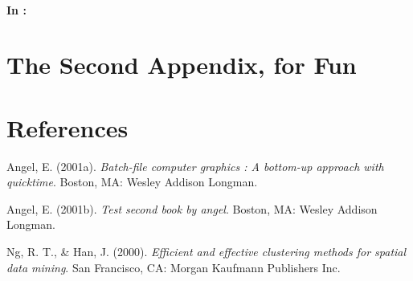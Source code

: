 \documentclass[12pt,twoside]{amherstthesis}
\begin{document}
  \subsubsection{\texorpdfstring{In
  \protect\hyperlink{ref_labels}{}:}{In :}}\label{in}
  
  \begin{Shaded}
  \begin{Highlighting}[]
  \NormalTok{(}\OperatorTok{!}
    \NormalTok{(}\NormalTok{, } \NormalTok{)}
  \NormalTok{(}\OperatorTok{!}
      \NormalTok{(}\NormalTok{, } \NormalTok{)}
  \NormalTok{(}\OperatorTok{!}
      \NormalTok{(}\NormalTok{, } \NormalTok{)}
  \NormalTok{(}\OperatorTok{!}
  \OperatorTok{::}\NormalTok{(}\NormalTok{)}
  \NormalTok{\}}
  \end{Highlighting}
  \end{Shaded}
  
  \chapter{The Second Appendix, for
  Fun}\label{the-second-appendix-for-fun}
  
  \backmatter
  
  \chapter{References}\label{references}
  
  \noindent
  
  \setlength{\parindent}{-0.20in} \setlength{\leftskip}{0.20in}
  \setlength{\parskip}{8pt}
  
  \hypertarget{refs}{}
  \hypertarget{ref-angel2001}{}
  Angel, E. (2001a). \emph{Batch-file computer graphics : A bottom-up
  approach with quicktime}. Boston, MA: Wesley Addison Longman.
  
  \hypertarget{ref-angel2002a}{}
  Angel, E. (2001b). \emph{Test second book by angel}. Boston, MA: Wesley
  Addison Longman.
  
  \hypertarget{ref-ng1994}{}
  Ng, R. T., \& Han, J. (2000). \emph{Efficient and effective clustering
  methods for spatial data mining}. San Francisco, CA: Morgan Kaufmann
  Publishers Inc.


\end{document}
